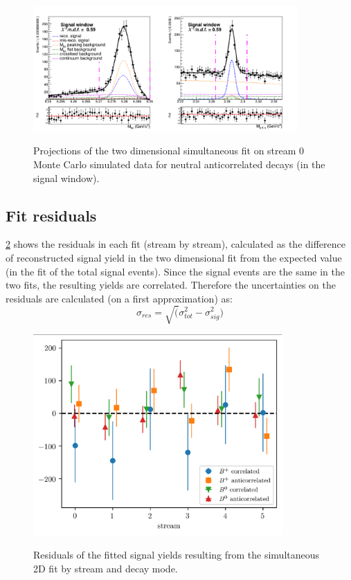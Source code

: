     \begin{figure}[H]
        \centering
        {\includegraphics[width=0.90\textwidth]{04-SimultaneousFit/figs/neutral_antiSignal_window_Total_2DFit_stream0.png}}
        \caption{Projections of the two dimensional simultaneous fit on stream 0 Monte Carlo simulated data for neutral anticorrelated decays (in the signal window).}
        \label{fig:neutral_antiSignal_window_Total_2DFit_stream0}
        \end{figure}


\subsection{Fit residuals}

\cref{fig:2DsimFitresiduals} shows the residuals in each fit (stream by stream), calculated as the difference of reconstructed
signal yield in the two dimensional fit from the expected value (in the fit of the total signal events). Since the signal events are the same 
in the two fits, the resulting yields are correlated. Therefore the uncertainties on the residuals are calculated  (on a first approximation)
as: 
\begin{equation}
\sigma_{res} = \sqrt(\sigma^2_{tot} - \sigma^2_{sig})
\end{equation}




\begin{figure}
\centering
{\includegraphics[width=0.85\textwidth]{04-SimultaneousFit/figs/2DsimFitresiduals.png}}
\caption{Residuals of the fitted signal yields resulting from the simultaneous 2D fit by stream and decay mode.}
\label{fig:2DsimFitresiduals}
\end{figure}

